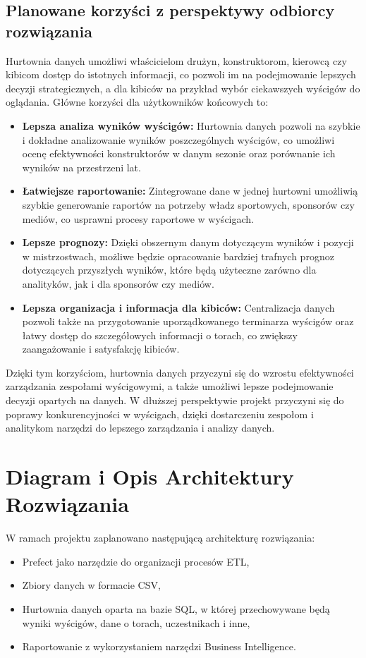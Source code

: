 \documentclass[12pt]{article}
\begin{document}
\subsection{Planowane korzyści z perspektywy odbiorcy rozwiązania}

Hurtownia danych umożliwi właścicielom drużyn, konstruktorom, kierowcą czy kibicom dostęp do istotnych informacji, co pozwoli im na podejmowanie lepszych decyzji strategicznych, a dla kibiców na przykład wybór ciekawszych wyścigów do oglądania. Główne korzyści dla użytkowników końcowych to:

\begin{itemize}
    \item \textbf{Lepsza analiza wyników wyścigów:} Hurtownia danych pozwoli na szybkie i dokładne analizowanie wyników poszczególnych wyścigów, co umożliwi ocenę efektywności konstruktorów w danym sezonie oraz porównanie ich wyników na przestrzeni lat.
    \item \textbf{Łatwiejsze raportowanie:} Zintegrowane dane w jednej hurtowni umożliwią szybkie generowanie raportów na potrzeby władz sportowych, sponsorów czy mediów, co usprawni procesy raportowe w wyścigach.
    \item \textbf{Lepsze prognozy:} Dzięki obszernym danym dotyczącym wyników i pozycji w mistrzostwach, możliwe będzie opracowanie bardziej trafnych prognoz dotyczących przyszłych wyników, które będą użyteczne zarówno dla analityków, jak i dla sponsorów czy mediów.
    \item \textbf{Lepsza organizacja i informacja dla kibiców:} Centralizacja danych pozwoli także na przygotowanie uporządkowanego terminarza wyścigów oraz łatwy dostęp do szczegółowych informacji o torach, co zwiększy zaangażowanie i satysfakcję kibiców.
\end{itemize}


Dzięki tym korzyściom, hurtownia danych przyczyni się do wzrostu efektywności zarządzania zespołami wyścigowymi, a także umożliwi lepsze podejmowanie decyzji opartych na danych. W dłuższej perspektywie projekt przyczyni się do poprawy konkurencyjności w wyścigach, dzięki dostarczeniu zespołom i analitykom narzędzi do lepszego zarządzania i analizy danych.
\section{Diagram i Opis Architektury Rozwiązania}
W ramach projektu zaplanowano następującą architekturę rozwiązania:

\begin{itemize}
    \item Prefect jako narzędzie do organizacji procesów ETL,
    \item Zbiory danych w formacie CSV,
    \item Hurtownia danych oparta na bazie SQL, w której przechowywane będą wyniki wyścigów, dane o torach, uczestnikach i inne,
    \item Raportowanie z wykorzystaniem narzędzi Business Intelligence.
\end{itemize}
\end{document}
